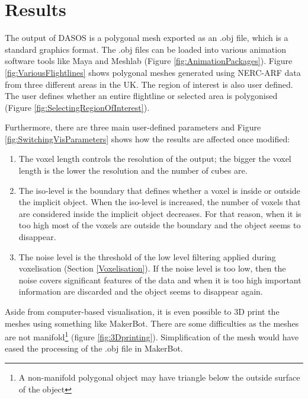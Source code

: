\documentclass{subfiles}
\begin{document}
\section{Results}\label{sec:MCResults}

\par The output of DASOS is a polygonal mesh exported as an .obj file, which is a standard graphics format. The .obj files can be loaded into various animation software tools like Maya and Meshlab (Figure \ref{fig:AnimationPackages}). Figure \ref{fig:VariousFlightlines} shows polygonal meshes generated using NERC-ARF data from three different areas in the UK.  The region of interest is also user defined. The user defines whether an entire flightline or selected area is polygonised (Figure \ref{fig:SelectingRegionOfInterest}). 

\par Furthermore, there are three main user-defined parameters and Figure \ref{fig:SwitchingVisParameters} shows how the results are affected once modified:
\begin{enumerate}
	\item The voxel length controls the resolution of the output; the bigger the voxel length is the lower the resolution and the number of cubes are.
	\item The iso-level is the boundary that defines whether a voxel is inside or outside the implicit object. When the iso-level is increased, the number of voxels that are considered inside the implicit object decreases. For that reason, when it is too high most of the voxels are outside the boundary and the object seems to disappear.
	\item The noise level is the threshold of the low level filtering applied during voxelisation (Section \ref{Voxelisation}). If the noise level is too low, then the noise covers significant features of the data and when it is too high important information are discarded and the object seems to disappear again.
\end{enumerate}

 
\par Aside from computer-based visualisation, it is even possible to 3D print the meshes using something like MakerBot.  There are some difficulties as the meshes are not manifold\footnote{ A non-manifold polygonal object may have triangle below the outside surface of the object} (figure \ref{fig:3Dprinting}). Simplification of the mesh would have eased the processing of the .obj file in MakerBot. 
 
\end{document}
